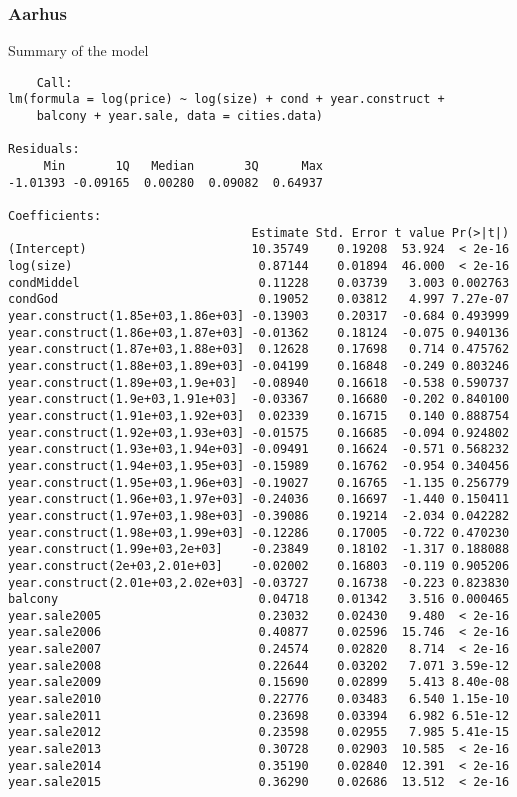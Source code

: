 \subsubsection{Aarhus}
Summary of the model
\begin{lstlisting}
    Call:
lm(formula = log(price) ~ log(size) + cond + year.construct + 
    balcony + year.sale, data = cities.data)

Residuals:
     Min       1Q   Median       3Q      Max 
-1.01393 -0.09165  0.00280  0.09082  0.64937 

Coefficients:
                                  Estimate Std. Error t value Pr(>|t|)
(Intercept)                       10.35749    0.19208  53.924  < 2e-16
log(size)                          0.87144    0.01894  46.000  < 2e-16
condMiddel                         0.11228    0.03739   3.003 0.002763
condGod                            0.19052    0.03812   4.997 7.27e-07
year.construct(1.85e+03,1.86e+03] -0.13903    0.20317  -0.684 0.493999
year.construct(1.86e+03,1.87e+03] -0.01362    0.18124  -0.075 0.940136
year.construct(1.87e+03,1.88e+03]  0.12628    0.17698   0.714 0.475762
year.construct(1.88e+03,1.89e+03] -0.04199    0.16848  -0.249 0.803246
year.construct(1.89e+03,1.9e+03]  -0.08940    0.16618  -0.538 0.590737
year.construct(1.9e+03,1.91e+03]  -0.03367    0.16680  -0.202 0.840100
year.construct(1.91e+03,1.92e+03]  0.02339    0.16715   0.140 0.888754
year.construct(1.92e+03,1.93e+03] -0.01575    0.16685  -0.094 0.924802
year.construct(1.93e+03,1.94e+03] -0.09491    0.16624  -0.571 0.568232
year.construct(1.94e+03,1.95e+03] -0.15989    0.16762  -0.954 0.340456
year.construct(1.95e+03,1.96e+03] -0.19027    0.16765  -1.135 0.256779
year.construct(1.96e+03,1.97e+03] -0.24036    0.16697  -1.440 0.150411
year.construct(1.97e+03,1.98e+03] -0.39086    0.19214  -2.034 0.042282
year.construct(1.98e+03,1.99e+03] -0.12286    0.17005  -0.722 0.470230
year.construct(1.99e+03,2e+03]    -0.23849    0.18102  -1.317 0.188088
year.construct(2e+03,2.01e+03]    -0.02002    0.16803  -0.119 0.905206
year.construct(2.01e+03,2.02e+03] -0.03727    0.16738  -0.223 0.823830
balcony                            0.04718    0.01342   3.516 0.000465
year.sale2005                      0.23032    0.02430   9.480  < 2e-16
year.sale2006                      0.40877    0.02596  15.746  < 2e-16
year.sale2007                      0.24574    0.02820   8.714  < 2e-16
year.sale2008                      0.22644    0.03202   7.071 3.59e-12
year.sale2009                      0.15690    0.02899   5.413 8.40e-08
year.sale2010                      0.22776    0.03483   6.540 1.15e-10
year.sale2011                      0.23698    0.03394   6.982 6.51e-12
year.sale2012                      0.23598    0.02955   7.985 5.41e-15
year.sale2013                      0.30728    0.02903  10.585  < 2e-16
year.sale2014                      0.35190    0.02840  12.391  < 2e-16
year.sale2015                      0.36290    0.02686  13.512  < 2e-16
                                     

\end{lstlisting}
